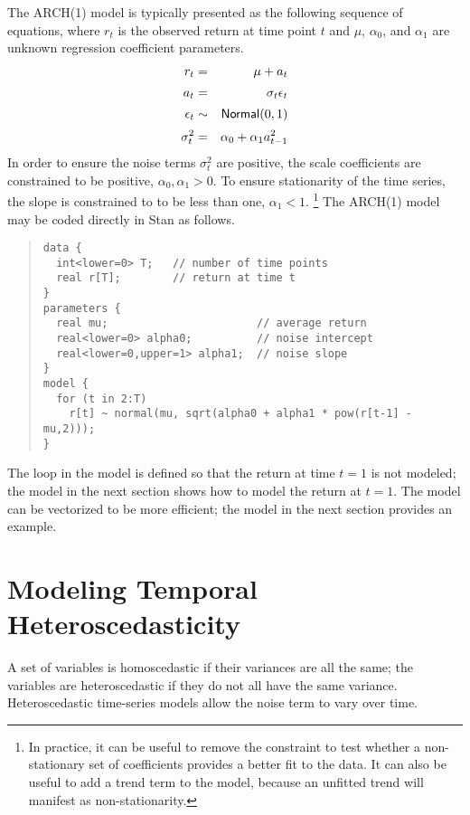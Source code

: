 The ARCH(1) model is typically presented as the following sequence of
equations, where $r_t$ is the observed return at time point $t$
and $\mu$, $\alpha_0$, and $\alpha_1$ are unknown regression coefficient parameters.
%
\begin{eqnarray*}
r_t & = & \mu + a_t 
\\[2pt]
a_t & = & \sigma_t \epsilon_t
\\[2pt]
\epsilon_t & \sim & \mbox{\sf Normal}(0,1)
\\[2pt]
\sigma^2_t & = & \alpha_0 + \alpha_1 a_{t-1}^2
\end{eqnarray*}
%
In order to ensure the noise terms $\sigma^2_t$ are positive, the
scale coefficients are constrained to be positive, $\alpha_0, \alpha_1
> 0$.  To ensure stationarity of the time series, the slope is 
constrained to to be less than one, $\alpha_1 < 1$.%
%
\footnote{In practice, it can be useful to remove the constraint to
  test whether a non-stationary set of coefficients provides a better
  fit to the data.  It can also be useful to add a trend term to the
  model, because an unfitted trend will manifest as non-stationarity.}
%
The ARCH(1) model may be coded directly in Stan as follows.
%
\begin{quote}
\begin{Verbatim}[fontsize=\small]
data {
  int<lower=0> T;   // number of time points
  real r[T];        // return at time t
}
parameters {
  real mu;                       // average return
  real<lower=0> alpha0;          // noise intercept
  real<lower=0,upper=1> alpha1;  // noise slope
}
model {
  for (t in 2:T)
    r[t] ~ normal(mu, sqrt(alpha0 + alpha1 * pow(r[t-1] - mu,2)));
}
\end{Verbatim}
\end{quote}
%
The loop in the model is defined so that the return at time $t=1$ is
not modeled; the model in the next section shows how to model the
return at $t=1$.  The model can be vectorized to be more efficient;
the model in the next section provides an example.

\section{Modeling Temporal Heteroscedasticity}

A set of variables is homoscedastic if their variances are all the
same; the variables are heteroscedastic if they do not all have the
same variance.  Heteroscedastic time-series models allow the noise
term to vary over time.

